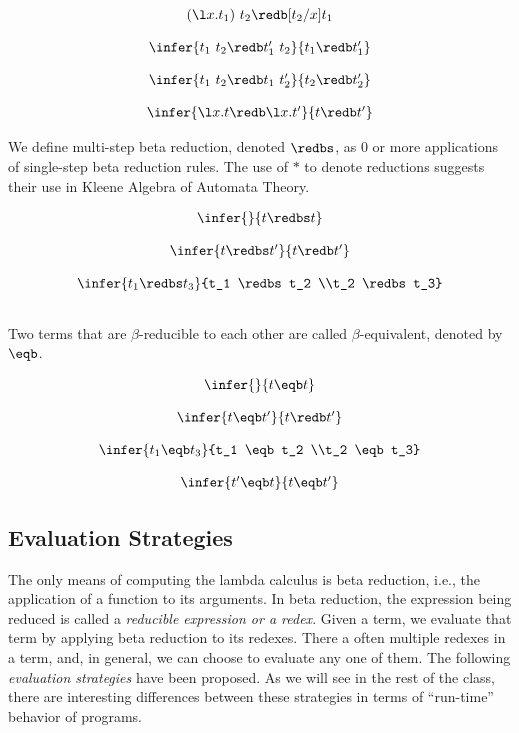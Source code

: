 \begin{definition}
\[
\begin{array}{c}
(\l x.t_1)~t_2 \redb [t_2/x] t_1 \\[4mm]
\infer{t_1~t_2 \redb t_1'~t_2}{t_1 \redb t'_1}\\[4mm]
\infer{t_1~t_2 \redb t_1~t'_2}{t_2 \redb t'_2}\\[4mm]
\infer{\l x.t \redb \l x.t'} {t \redb t'}
\end{array}
\]
\end{definition}


We define multi-step beta reduction, denoted $\redbs$, as $0$ or more
applications of single-step beta reduction rules.  The use of $*$ to
denote reductions suggests their use in Kleene Algebra of Automata
Theory.

\begin{definition}
\[
\begin{array}{c}
\infer{\strut} {t \redbs t}\\[4mm]
\infer{t \redbs t'} {t \redb t'} \\[4mm]
\infer{t_1 \redbs t_3} {t_1 \redbs t_2 \\t_2 \redbs t_3} \\[4mm]
\end{array}
\]
\end{definition}

Two terms that are $\beta$-reducible to each other are called
$\beta$-equivalent, denoted by $\eqb$. 

\begin{definition}
\[
\begin{array}{c}
\infer{\strut} {t \eqb t} \\[4mm]
\infer{t \eqb t'} {t \redb t'}  \\[4mm]
\infer{t_1 \eqb t_3} {t_1 \eqb t_2 \\t_2 \eqb t_3}  \\[4mm]
\infer{t' \eqb t} {t \eqb t'}
\end{array}
\]
\end{definition}


\subsection{Evaluation Strategies}

The only means of computing the lambda calculus is beta reduction,
i.e., the application of a function to its arguments.  In beta
reduction, the expression being reduced is called a \emph{reducible
  expression or a redex}.  Given a term, we evaluate that term by
applying beta reduction to its redexes.  There a often multiple
redexes in a term, and, in general, we can choose to evaluate any one
of them.  The following \emph{evaluation strategies} have been
proposed.  As we will see in the rest of the class, there are
interesting differences between these strategies in terms of
``run-time'' behavior of programs.

